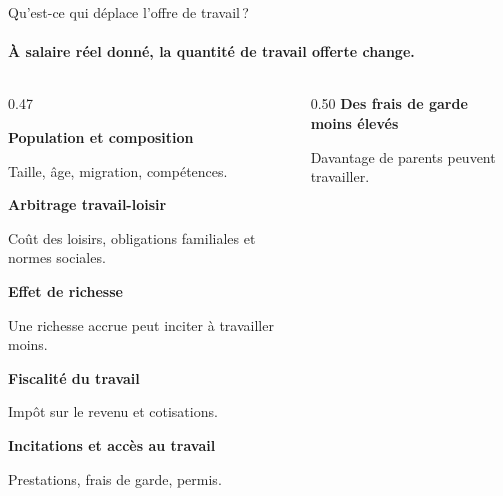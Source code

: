 \documentclass[aspectratio=169]{beamer}
\begin{document}
\begin{frame}{Qu'est-ce qui déplace l'offre de travail\,?}\examtag
   \framesubtitle{À salaire réel donné, la quantité de travail offerte change.}
   \begin{columns}[c,onlytextwidth]
      \begin{column}{0.47\textwidth}
         \begin{tcolorbox}[colback=HECnavy!5, colframe=HECnavy!5, boxrule=0pt, arc=7pt, left=9pt, right=9pt, top=7pt, bottom=7pt, before skip=0pt, after skip=0pt]
            \RaggedRight\footnotesize{}
            \textbf{\textcolor{HECnavy}{Population et composition}}\par
            Taille, âge, migration, compétences.\par\smallskip
            \textbf{\textcolor{HECnavy}{Arbitrage travail-loisir}}\par
            Coût des loisirs, obligations familiales et normes sociales.\par\smallskip
            \textbf{\textcolor{HECnavy}{Effet de richesse}}\par
            Une richesse accrue peut inciter à travailler moins.\par\smallskip
            \textbf{\textcolor{HECnavy}{Fiscalité du travail}}\par
            Impôt sur le revenu et cotisations.\par\smallskip
            \textbf{\textcolor{HECnavy}{Incitations et accès au travail}}\par
            Prestations, frais de garde, permis.
         \end{tcolorbox}
      \end{column}
      \begin{column}{0.50\textwidth}
         \centering
         {\small\bfseries\textcolor{HECnavy}{Des frais de garde moins élevés}}\par\smallskip
         \par\smallskip
         {\footnotesize Davantage de parents peuvent travailler.\par}
      \end{column}
   \end{columns}
\end{frame}
\end{document}
